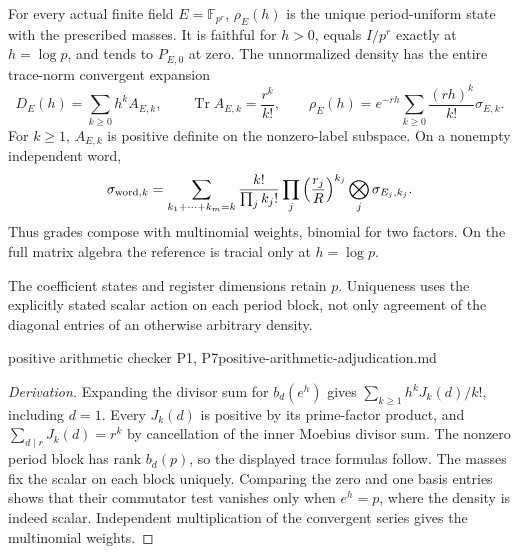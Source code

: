\begin{proposition}
\statusProved\quad
For every actual finite field $E=\mathbb F_{p^r}$, $\rho_E(h)$ is the
unique period-uniform state with the prescribed masses. It is faithful for
$h>0$, equals $I/p^r$ exactly at $h=\log p$, and tends to $P_{E,0}$ at zero.
The unnormalized density has the entire trace-norm convergent expansion
\[
 D_E(h)=\sum_{k\geq0}h^kA_{E,k},\qquad
 \operatorname{Tr}A_{E,k}=\frac{r^k}{k!},\qquad
 \rho_E(h)=e^{-rh}\sum_{k\geq0}\frac{(rh)^k}{k!}\sigma_{E,k}.
\]
For $k\geq1$, $A_{E,k}$ is positive definite on the nonzero-label subspace.
On a nonempty independent word,
\[
 \sigma_{{\rm word},k}=
 \sum_{k_1+\cdots+k_m=k}
 \frac{k!}{\prod_jk_j!}\prod_j\left(\frac{r_j}{R}\right)^{k_j}
 \bigotimes_j\sigma_{E_j,k_j}.
\]
Thus grades compose with multinomial weights, binomial for two factors.
On the full matrix algebra the reference is tracial only at $h=\log p$.
\end{proposition}
\begin{scope}
The coefficient states and register dimensions retain $p$. Uniqueness
uses the explicitly stated scalar action on each period block, not only
agreement of the diagonal entries of an otherwise arbitrary density.
\end{scope}
{positive arithmetic checker P1, P7}{positive-arithmetic-adjudication.md}

\begin{proof}[Derivation]
Expanding the divisor sum for $b_d(e^h)$ gives
$\sum_{k\geq1}h^kJ_k(d)/k!$, including $d=1$. Every $J_k(d)$ is positive
by its prime-factor product, and $\sum_{d\mid r}J_k(d)=r^k$ by cancellation
of the inner Moebius divisor sum. The nonzero period block has rank $b_d(p)$,
so the displayed trace formulas follow. The masses fix the scalar on
each block uniquely. Comparing the zero and one basis entries shows that
their commutator test vanishes only when $e^h=p$, where the density is
indeed scalar. Independent multiplication of the convergent series gives
the multinomial weights.
\end{proof}

